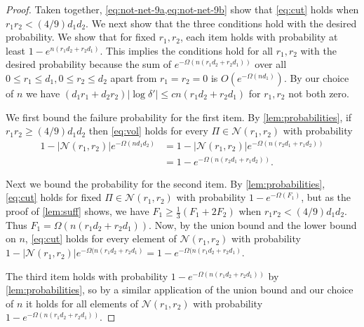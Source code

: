 \documentclass[aos]{imsart}
\theoremstyle{definition}
\numberwithin{equation}{section}
\newcommand{\cN}{\mathcal{N}}
\begin{document}
\begin{appendix}
\begin{proof}
Taken together, \cref{eq:not-net-9a,eq:not-net-9b} show that \cref{eq:cut} holds when $r_1 r_2 < (4/9) d_1 d_2$. We next show that the three conditions hold with the desired probability. We show that for fixed $r_1, r_2$, each item holds with probability at least $1 - e^{n (r_1 d_2 + r_2 d_1)}$. This implies the conditions hold for all $r_1, r_2$ with the desired probability because the sum of $e^{-\Omega(n (r_1d_2 + r_2 d_1))}$ over all $0 \leq r_1 \leq d_1, 0 \leq r_2 \leq d_2$ apart from $r_1 = r_2 = 0$ is $O(e^{- \Omega( n d_1)})$. By our choice of $n$ we have $(d_1r_1 + d_2 r_2) |\log \delta'| \leq c n (r_1d_2 + r_2 d_1)$ for $r_1, r_2$ not both zero.

We first bound the failure probability for the first item. By \cref{lem:probabilities}, if $r_1 r_2 \geq (4/9) d_1 d_2$ then \cref{eq:vol} holds for every $\Pi \in \cN(r_1, r_2)$ with probability
\begin{align*}
1 - |\cN(r_1, r_2)|e^{- \Omega( n d_1 d_2) } &= 1 - |\cN(r_1, r_2)| e^{ - \Omega(n (r_2d_1 + r_1d_2))}\\
&= 1 - e^{ - \Omega(n (r_2d_1 + r_1d_2))}.
\end{align*}

Next we bound the probability for the second item. By \cref{lem:probabilities}, \cref{eq:cut} holds for fixed $\Pi \in \cN(r_1, r_2)$ with probability $1 - e^{-\Omega( F_1)}$, but as the proof of \cref{lem:suff} shows, we have $F_1 \geq \frac{1}{3} (F_1 + 2 F_2)$ when $r_1 r_2 < (4/9) d_1 d_2$. Thus $F_1 = \Omega(n (r_1d_2 + r_2 d_1))$. Now, by the union bound and the lower bound on $n$, \cref{eq:cut} holds for every element of $\cN(r_1, r_2)$ with probability $1 - |\cN(r_1,r_2)| e^{-\Omega(n (r_1d_2 + r_2 d_1)} = 1 - e^{-\Omega(n (r_1d_2 + r_2 d_1)}$.


The third item holds with probability $1 - e^{-\Omega(n (r_1d_2 + r_2 d_1))}$ by \cref{lem:probabilities}, so by a similar application of the union bound and our choice of $n$ it holds for all elements of $\cN(r_1, r_2)$ with probability $1 - e^{-\Omega(n (r_1d_2 + r_2 d_1))}$. \end{proof}


\end{appendix}
\end{document}
